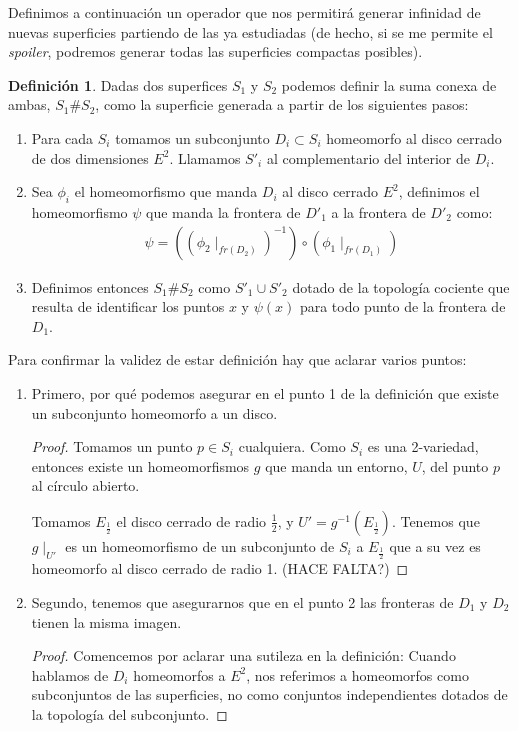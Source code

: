 \documentclass[a4paper,11pt,spanish, twoside, leqno]{tfg-uam}
\theoremstyle{definition}
\newtheorem{defin}[teor]{Definici\'on}
\begin{document}
Definimos a continuación un operador que nos permitirá generar infinidad de nuevas superficies partiendo de las ya estudiadas (de hecho, si se me permite el \textit{spoiler}, podremos generar todas las superficies compactas posibles).



\begin{defin}\label{defin:sumaconexa}
	Dadas dos superfices $S_1$ y $S_2$ podemos definir la suma conexa de ambas, $S_1\#S_2$, como la superficie generada a partir de los siguientes pasos:
	
	\begin{enumerate}
		\item 
		Para cada $S_i$ tomamos un subconjunto $D_i\subset S_i$ homeomorfo al disco cerrado de dos dimensiones $E^2$. Llamamos $S'_i$ al complementario del interior de $D_i$.
		\item 
		Sea $\phi_i$ el homeomorfismo que manda $D_i$ al disco cerrado $E^2$, definimos el homeomorfismo $\psi$ que manda la frontera de $D'_1$ a la frontera de $D'_2$ como:
		\begin{align*}
		\psi = ((\phi_{2}\mid_{fr(D_2)})^{-1}) \circ (\phi_1\mid_{fr(D_1)})
		\end{align*}
		\item 
		Definimos entonces $S_1\#S_2$ como $S'_1\cup S'_2$ dotado de la topología cociente que resulta de identificar los puntos $x$ y $\psi(x)$ para todo punto de la frontera de $D_1$.
	\end{enumerate}
	
	Para confirmar la validez de estar definición hay que aclarar varios puntos:
	\begin{enumerate}
		\item 
		Primero, por qué podemos asegurar en el punto 1 de la definición que existe un subconjunto homeomorfo a un disco.
		\begin{proof}
			Tomamos un punto $p\in S_i$ cualquiera. Como $S_i$ es una 2-variedad, entonces existe un homeomorfismos $g$ que manda un entorno, $U$, del punto $p$ al círculo abierto. 
			
			Tomamos $E_{\frac{1}{2}}$ el disco cerrado de radio $\frac{1}{2}$, y $U'= g^{-1}(E_{\frac{1}{2}})$. Tenemos que $g\mid_{U'}$ es un homeomorfismo de un subconjunto de $S_i$ a $E_{\frac{1}{2}}$ que a su vez es homeomorfo al disco cerrado de radio 1. (HACE FALTA?)
		\end{proof} 
		\item 
		Segundo, tenemos que asegurarnos que en el punto 2 las fronteras de $D_1$ y $D_2$ tienen la misma imagen.
		\begin{proof}
			Comencemos por aclarar una sutileza en la definición: Cuando hablamos de $D_i$ homeomorfos a $E^2$, nos referimos a homeomorfos como subconjuntos de las superficies, no como conjuntos independientes dotados de la topología del subconjunto.
			

\end{proof}
\end{enumerate}
\end{defin}
\end{document}
